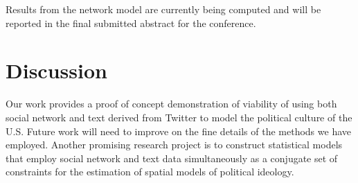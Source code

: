 \documentclass[10pt]{article}
\begin{document}
Results from the network model are currently being computed and will be reported in the final submitted abstract for the conference.


\section{Discussion}
Our work provides a proof of concept demonstration of viability of using both social network and text derived from Twitter to model the political culture of the U.S. Future work will need to improve on the fine details of the methods we have employed. Another promising research project is to construct statistical models that employ social network and text data simultaneously as a conjugate set of constraints for the estimation of spatial models of political ideology.




\newpage
{}
 
\end{document}
